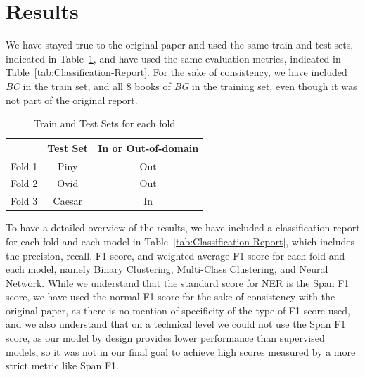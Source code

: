 \documentclass[11pt]{article}
\begin{document}
\section{Results}
We have stayed true to the original paper and used the same train and test sets, indicated in Table~\ref{tab:Train-Test-Sets}, 
and have used the same evaluation metrics, indicated in Table~\ref{tab:Classification-Report}. For the sake of consistency, we have included
\textit{BC} in the train set, and all 8 books of \textit{BG} in the training set, even though it was not part of the original report.

\begin{table}[H]
  \centering
  \begin{tabular}{|l|c|c|}
  \hline
  \textbf{} & \textbf{Test Set} & \textbf{In or Out-of-domain} \\
  \hline
  Fold 1   & Piny & Out \\
  \hline
  Fold 2   & Ovid & Out \\
  \hline
  Fold 3   & Caesar & In \\
  \hline
  \end{tabular}
  \caption{Train and Test Sets for each fold}
  \label{tab:Train-Test-Sets}
\end{table}

To have a detailed overview of the results, we have included a classification report for each fold and each model 
in Table~\ref{tab:Classification-Report}, which includes the precision, recall, F1 score, and weighted average F1 score for each fold and each model,
namely Binary Clustering, Multi-Class Clustering, and Neural Network. While we understand that the standard score for NER is the
Span F1 score, we have used the normal F1 score for the sake of consistency with the original paper, as there is no mention of specificity of the type
of F1 score used, and we also understand that on a technical level we could not use the Span F1 score, as our model by design provides lower
performance than supervised models, so it was not in our final goal to achieve high scores measured by a more strict metric like Span F1.
\end{document}
